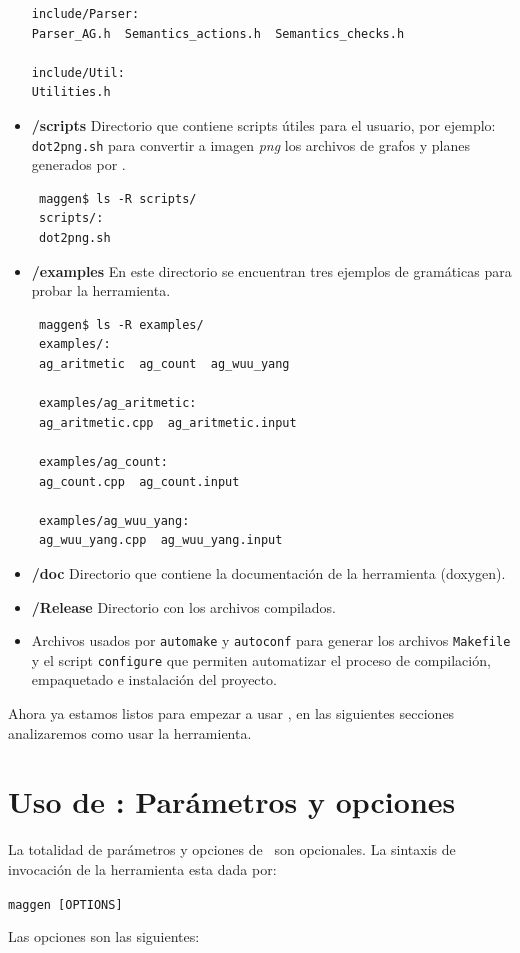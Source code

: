 \begin{itemize}
{\begin{verbatim}
include/Parser:
Parser_AG.h  Semantics_actions.h  Semantics_checks.h

include/Util:
Utilities.h
\end{verbatim}}

\item \textbf{/scripts} Directorio que contiene scripts útiles para el usuario, por ejemplo: \texttt{dot2png.sh} para convertir a imagen \textit{png} los archivos de grafos y planes generados por \maggen.
{\footnotesize \begin{verbatim}
 maggen$ ls -R scripts/
 scripts/:
 dot2png.sh
\end{verbatim} }
 
\item \textbf{/examples} En este directorio se encuentran tres ejemplos de gramáticas para probar la herramienta.
{\footnotesize \begin{verbatim}
 maggen$ ls -R examples/
 examples/:
 ag_aritmetic  ag_count  ag_wuu_yang

 examples/ag_aritmetic:
 ag_aritmetic.cpp  ag_aritmetic.input

 examples/ag_count:
 ag_count.cpp  ag_count.input

 examples/ag_wuu_yang:
 ag_wuu_yang.cpp  ag_wuu_yang.input
\end{verbatim} }

\item \textbf{/doc} Directorio que contiene la documentación de la herramienta (doxygen).
\item \textbf{/Release} Directorio con los archivos compilados.
\item Archivos usados por \texttt{automake} y \texttt{autoconf} para generar los archivos \texttt{Makefile} y el script \texttt{configure} que permiten automatizar el proceso de compilación, empaquetado e instalación del proyecto.
\end{itemize}

Ahora ya estamos listos para empezar a usar \maggen, en las siguientes secciones analizaremos como usar la herramienta.

\section{Uso de \maggen: Parámetros y opciones}
\label{sec:uso-maggen}
La totalidad de parámetros y opciones de \maggen\ son opcionales. La sintaxis de invocación de la herramienta esta dada por:\\
\begin{center}\texttt{maggen [OPTIONS]}\end{center}
Las opciones son las siguientes:

